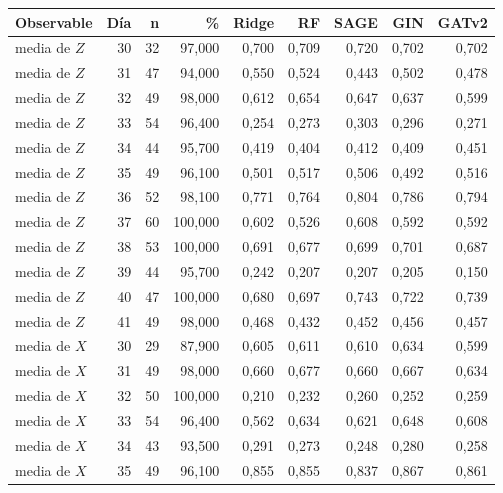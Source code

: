 \begin{table}[htbp]
    \centering
    {\footnotesize
    \begin{tabular}{@{}lrrrrrrrr@{}}
        \toprule
        \textbf{Observable} & \textbf{Día} & \textbf{n} & \textbf{\%} & \textbf{Ridge} & \textbf{RF} & \textbf{SAGE} & \textbf{GIN} & \textbf{GATv2} \\
        \midrule
        media de $Z$ & 30 & 32 & 97,000 & 0,700 & 0,709 & 0,720 & 0,702 & 0,702 \\
        media de $Z$ & 31 & 47 & 94,000 & 0,550 & 0,524 & 0,443 & 0,502 & 0,478 \\
        media de $Z$ & 32 & 49 & 98,000 & 0,612 & 0,654 & 0,647 & 0,637 & 0,599 \\
        media de $Z$ & 33 & 54 & 96,400 & 0,254 & 0,273 & 0,303 & 0,296 & 0,271 \\
        media de $Z$ & 34 & 44 & 95,700 & 0,419 & 0,404 & 0,412 & 0,409 & 0,451 \\
        media de $Z$ & 35 & 49 & 96,100 & 0,501 & 0,517 & 0,506 & 0,492 & 0,516 \\
        media de $Z$ & 36 & 52 & 98,100 & 0,771 & 0,764 & 0,804 & 0,786 & 0,794 \\
        media de $Z$ & 37 & 60 & 100,000 & 0,602 & 0,526 & 0,608 & 0,592 & 0,592 \\
        media de $Z$ & 38 & 53 & 100,000 & 0,691 & 0,677 & 0,699 & 0,701 & 0,687 \\
        media de $Z$ & 39 & 44 & 95,700 & 0,242 & 0,207 & 0,207 & 0,205 & 0,150 \\
        media de $Z$ & 40 & 47 & 100,000 & 0,680 & 0,697 & 0,743 & 0,722 & 0,739 \\
        media de $Z$ & 41 & 49 & 98,000 & 0,468 & 0,432 & 0,452 & 0,456 & 0,457 \\
        media de $X$ & 30 & 29 & 87,900 & 0,605 & 0,611 & 0,610 & 0,634 & 0,599 \\
        media de $X$ & 31 & 49 & 98,000 & 0,660 & 0,677 & 0,660 & 0,667 & 0,634 \\
        media de $X$ & 32 & 50 & 100,000 & 0,210 & 0,232 & 0,260 & 0,252 & 0,259 \\
        media de $X$ & 33 & 54 & 96,400 & 0,562 & 0,634 & 0,621 & 0,648 & 0,608 \\
        media de $X$ & 34 & 43 & 93,500 & 0,291 & 0,273 & 0,248 & 0,280 & 0,258 \\
        media de $X$ & 35 & 49 & 96,100 & 0,855 & 0,855 & 0,837 & 0,867 & 0,861 \\

\end{tabular}}
\end{table}
